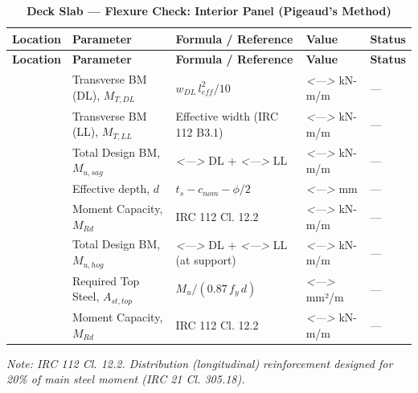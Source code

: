 \documentclass[12pt,a4paper]{report}
\numberwithin{table}{chapter}
\numberwithin{figure}{chapter}
\newcommand{\placeholder}[1]{\textit{\textless #1\textgreater}}
\begin{document}
\vspace{1em}
\begin{longtable}{|C{3.0cm}|C{3.5cm}|C{3.0cm}|>{\centering\arraybackslash}p{4.2cm}|C{1.8cm}|}
\caption{\textbf{Deck Slab --- Flexure Check: Interior Panel (Pigeaud's Method)}}
\hline
{} \textbf{Location} & \textbf{Parameter} & \textbf{Formula / Reference} & \textbf{Value} & \textbf{Status} \\[6pt]
\hline
\endfirsthead
\hline
{} \textbf{Location} & \textbf{Parameter} & \textbf{Formula / Reference} & \textbf{Value} & \textbf{Status} \\[6pt]
\hline
\endhead
{} & Transverse BM (DL), $M_{T,DL}$ & $w_{DL}\,l_{eff}^2/10$ & \placeholder{---} kN-m/m & --- \\[6pt]
 & Transverse BM (LL), $M_{T,LL}$ & Effective width (IRC 112 B3.1) & \placeholder{---} kN-m/m & --- \\[6pt]
 & Total Design BM, $M_{u,sag}$ & \placeholder{---} DL + \placeholder{---} LL & \placeholder{---} kN-m/m & --- \\[6pt]
 & Effective depth, $d$ & $t_s - c_{nom} - \phi/2$ & \placeholder{---} mm & --- \\[6pt]
 & Moment Capacity, $M_{Rd}$ & IRC 112 Cl. 12.2 & \placeholder{---} kN-m/m & --- \\[6pt]
\hline
{} & Total Design BM, $M_{u,hog}$ & \placeholder{---} DL + \placeholder{---} LL (at support) & \placeholder{---} kN-m/m & --- \\[6pt]
 & Required Top Steel, $A_{st,top}$ & $M_u / (0.87\,f_y\,d)$ & \placeholder{---} mm²/m & --- \\[6pt]
 & Moment Capacity, $M_{Rd}$ & IRC 112 Cl. 12.2 & \placeholder{---} kN-m/m & --- \\[6pt]
\hline
\end{longtable}
\noindent\textit{Note: IRC 112 Cl. 12.2. Distribution (longitudinal) reinforcement designed for 20\% of main steel moment (IRC 21 Cl. 305.18).}
\end{document}
